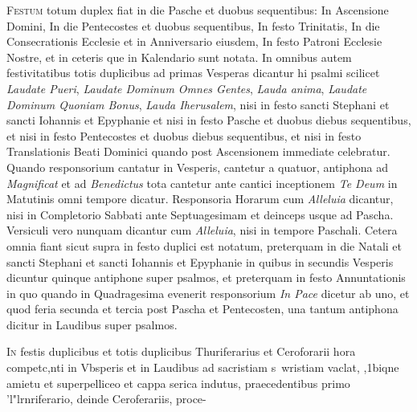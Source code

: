 \begin{multicols*}{2}
{\color{Red} }
\lettrine[lines=2]{\zallmancaps \color{Blue} F}{estum} totum duplex fiat in die Pasche et duobus sequentibus: In Ascensione Domini, In die Pentecostes et duobus sequentibus, In festo Trinitatis, In die Consecrationis Ecclesie et in Anniversario eiusdem, In festo Patroni Ecclesie Nostre, et in ceteris que in Kalendario sunt notata.
In omnibus autem festivitatibus totis duplicibus ad primas Vesperas dicantur hi psalmi scilicet \textit{Laudate Pueri}, \textit{Laudate Dominum Omnes Gentes}, \textit{Lauda anima}, \textit{Laudate Dominum Quoniam Bonus}, \textit{Lauda Iherusalem}, nisi in festo sancti Stephani et sancti Iohannis et Epyphanie et nisi in festo Pasche et duobus diebus sequentibus, et nisi in festo Pentecostes et duobus diebus sequentibus, et nisi in festo Translationis Beati Dominici quando post Ascensionem immediate celebratur. Quando responsorium cantatur in Vesperis, cantetur a quatuor, antiphona ad \textit{Magnificat} et ad \textit{Benedictus} tota cantetur ante cantici inceptionem \textit{Te Deum} in Matutinis omni tempore dicatur. Responsoria Horarum cum \textit{Alleluia} dicantur, nisi in Completorio Sabbati ante Septuagesimam et deinceps usque ad Pascha. Versiculi vero nunquam dicantur cum \textit{Alleluia}, nisi in tempore Paschali.
Cetera omnia fiant sicut supra in festo duplici est notatum, preterquam in die Natali et sancti Stephani et sancti Iohannis et Epyphanie in quibus in secundis Vesperis dicuntur quinque antiphone super psalmos, et preterquam in festo Annuntationis in quo quando in Quadragesima evenerit responsorium \textit{In Pace} dicetur ab uno, et quod feria secunda et tercia post Pascha et Pentecosten, una tantum antiphona dicitur in Laudibus super psalmos.

{\color{Red} }
\lettrine[lines=2]{\zallmancaps \color{Red} I}{n} festis duplicibus et totis duplicibus Thuriferarius 
et
Ceroforarii hora competc,nti in Vbsperis et in Laudibus ad sacristiam
s~wristiam vaclat, ,1biqne amietu et superpelliceo et cappa serica indutus, praecedentibus primo 'l"lrnriferario, deinde Ceroferariis, proce-



\end{multicols*}
